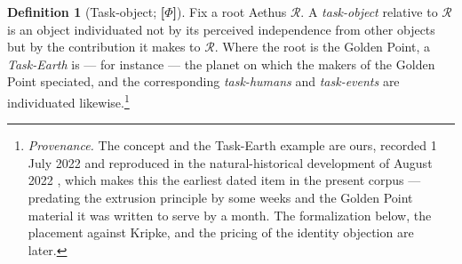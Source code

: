 \documentclass[11pt]{article}
\numberwithin{equation}{section}
\theoremstyle{plain}
\theoremstyle{definition}
\newtheorem{definition}[theorem]{Definition}
\theoremstyle{remark}
\begin{document}
\begin{definition}[Task-object; \textbf{[$\Phi$]}]\label{to:def:taskobject}
Fix a root Aethus $\mathcal R$. A \emph{task-object} relative to
$\mathcal R$ is an object individuated not by its perceived independence
from other objects but by the contribution it makes to
$\mathcal R$. Where the root is the Golden Point, a \emph{Task-Earth} is
--- for instance --- the planet on which the makers of the Golden Point
speciated, and the corresponding \emph{task-humans} and
\emph{task-events} are individuated likewise.\footnote{%
\emph{Provenance.} The concept and the Task-Earth example are
ours, recorded 1 July 2022 and reproduced in the natural-historical
development of August 2022 \cite{GoldenScience22}, which makes this the
earliest dated item in the present corpus --- predating the extrusion
principle by some weeks and the Golden Point material it was written to
serve by a month. The formalization below, the placement against Kripke,
and the pricing of the identity objection are later.}
\end{definition}
\end{document}

